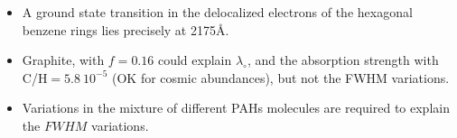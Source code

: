 \begin{frame}\frametitle{}


\begin{minipage}[t]{0.5\textwidth}
\begin{itemize}
\item A ground state transition in the delocalized electrons of the
hexagonal benzene rings lies precisely at 2175\AA.


\item Graphite, with  $f = 0.16$ could explain  $\lambda_\circ$, and
the absorption strength with C/H$=5.8~10^{-5}$ (OK for cosmic
abundances), but not the FWHM variations. 

\item Variations in the mixture of different PAHs molecules are
required to explain the $FWHM$ variations. 
\end{itemize}
\end{minipage}
\hfill
\begin{minipage}[t]{0.49\textwidth}
\vspace{-0.1cm}
  \begin{center}
    \end{center}
\end{minipage}


\end{frame}
